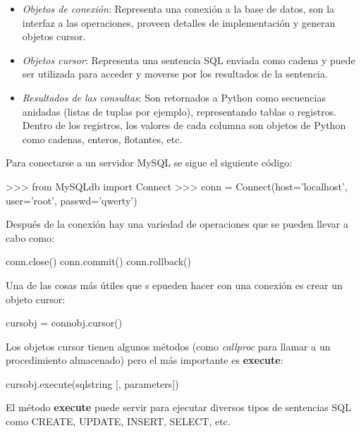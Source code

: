 \begin{itemize}
\item \textit{Objetos de conexión}: Representa una conexión a la base de datos, son la interfaz a las operaciones, proveen detalles de implementación y generan objetos cursor.

\item \textit{Objetos cursor}: Representa una sentencia SQL enviada como cadena y puede ser utilizada para acceder y moverse por los resultados de la sentencia.

\item \textit{Resultados de las consultas}: Son retornados a Python como secuencias anidadas (listas de tuplas por ejemplo), representando tablas o registros. Dentro de los registros, los valores de cada columna son objetos de Python como cadenas, enteros, flotantes, etc. 
\end{itemize}

Para conectarse a un servidor MySQL se sigue el siguiente código:\\

\begin{pyglist} [language=python]
>>> from MySQLdb import Connect
>>> conn = Connect(host='localhost', user='root', passwd='qwerty')
\end{pyglist}

Después de la conexión hay una variedad de operaciones que se pueden llevar a cabo como:\\

\begin{pyglist} [language=python]
conn.close()
conn.commit()
conn.rollback()
\end{pyglist}

Una de las cosas más útiles que s epueden hacer con una conexión es crear un objeto cursor:\\

\begin{pyglist} [language=python]
cursobj = connobj.cursor()
\end{pyglist}

Los objetos cursor tienen algunos métodos (como \textit{callproc} para llamar a un procedimiento almacenado) pero el más importante es \textbf{execute}:\\

\begin{pyglist} [language=python]
cursobj.execute(sqlstring [, parameters])
\end{pyglist}

El método \textbf{execute} puede servir para ejecutar diversos tipos de sentencias SQL como CREATE, UPDATE, INSERT, SELECT, etc.\\


